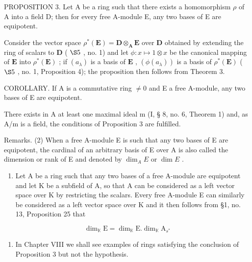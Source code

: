 PROPOSITION 3. Let A be a ring such that there exists a homomorphism \(\rho\) of A into a field D; then for every free A-module E, any two bases of E are equipotent.

Consider the vector space \(\rho^{*}(\mathbf{E}) = \mathbf{D} \otimes_{\mathbf{A}} \mathbf{E}\) over \(\mathbf{D}\) obtained by extending the ring of scalars to \(\mathbf{D}\) ( \(\S 5\) , no. 1) and let \(\phi: x \mapsto 1 \otimes x\) be the canonical mapping of \(\mathbf{E}\) into \(\rho^{*}(\mathbf{E})\) ; if \((a_{\lambda})\) is a basis of \(\mathbf{E}\) , \((\phi(a_{\lambda}))\) is a basis of \(\rho^{*}(\mathbf{E})\) ( \(\S 5\) , no. 1, Proposition 4); the proposition then follows from Theorem 3.

COROLLARY. If A is a commutative ring \(\neq0\) and E a free A-module, any two bases of E are equipotent.

There exists in A at least one maximal ideal m (I, § 8, no. 6, Theorem 1) and, as A/m is a field, the conditions of Proposition 3 are fulfilled.

Remarks. (2) When a free A-module E is such that any two bases of E are equipotent, the cardinal of an arbitrary basis of E over A is also called the dimension or rank of E and denoted by \(\dim_{A}E\) or \(\dim E\) .

\begin{enumerate}
\def\labelenumi{(\arabic{enumi})}
\setcounter{enumi}{2}
\tightlist
\item
  Let A be a ring such that any two bases of a free A-module are equipotent and let K be a subfield of A, so that A can be considered as a left vector space over K by restricting the scalars. Every free A-module E can similarly be considered as a left vector space over K and it then follows from §1, no. 13, Proposition 25 that
\end{enumerate}

\[
\dim_ {\mathbb {K}} \mathrm{E} = \dim_ {\mathbb {K}} \mathrm{E}. \dim_ {\mathbb {K}} \mathrm{A} _ {s ^ {*}}\tag{2}
\]

\begin{enumerate}
\def\labelenumi{(\arabic{enumi})}
\setcounter{enumi}{3}
\tightlist
\item
  In Chapter VIII we shall see examples of rings satisfying the conclusion of Proposition 3 but not the hypothesis.
\end{enumerate}
